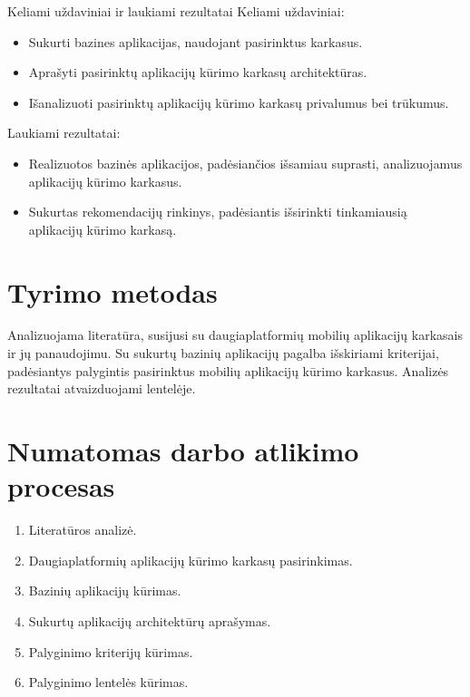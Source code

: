 \documentclass{VUMIFInfBakalaurinis}
\begin{document}
\begin {section}{Keliami uždaviniai ir laukiami rezultatai}
Keliami uždaviniai:
\begin{itemize}
  \item Sukurti bazines aplikacijas, naudojant pasirinktus karkasus.
  \item Aprašyti pasirinktų aplikacijų kūrimo karkasų architektūras.
  \item Išanalizuoti pasirinktų aplikacijų kūrimo karkasų privalumus bei trūkumus.
\end{itemize}

Laukiami rezultatai:
\begin{itemize}
  \item Realizuotos bazinės aplikacijos, padėsiančios išsamiau suprasti, analizuojamus aplikacijų kūrimo karkasus.
  \item Sukurtas rekomendacijų rinkinys, padėsiantis išsirinkti tinkamiausią aplikacijų kūrimo karkasą.
\end{itemize}

\end{section}

\section{Tyrimo metodas}
Analizuojama literatūra, susijusi su daugiaplatformių mobilių aplikacijų karkasais ir jų panaudojimu. Su sukurtų bazinių aplikacijų pagalba išskiriami kriterijai, padėsiantys palygintis pasirinktus mobilių aplikacijų kūrimo karkasus. Analizės rezultatai atvaizduojami lentelėje.

\section{Numatomas darbo atlikimo procesas}
\begin{enumerate}
  \item Literatūros analizė.
  \item Daugiaplatformių aplikacijų kūrimo karkasų pasirinkimas.
  \item Bazinių aplikacijų kūrimas.
  \item Sukurtų aplikacijų architektūrų aprašymas.
  \item Palyginimo kriterijų kūrimas.
  \item Palyginimo lentelės kūrimas.
\end{enumerate}
\end{document}
